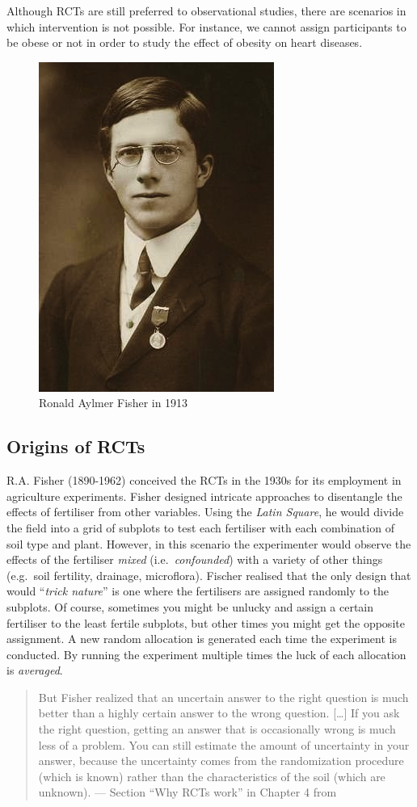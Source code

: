 \documentclass[
]{book}
\begin{document}
Although RCTs are still preferred to observational studies, there are scenarios in which intervention is not possible. For instance, we cannot assign participants to be obese or not in order to study the effect of obesity on heart diseases.

\begin{figure}  
 \begin{center}
    \includegraphics[width=.22\textwidth]{Figures/RAFisher.jpeg}  
  \captionsetup{labelformat=empty}
  \caption{Ronald Aylmer Fisher in 1913} 
\end{center}
\end{figure}
\addtocounter{figure}{-1}

\hypertarget{origins-of-rcts}{%
\subsection{Origins of RCTs}\label{origins-of-rcts}}

R.A. Fisher (1890-1962) conceived the RCTs in the 1930s for its employment in agriculture experiments. Fisher designed intricate approaches to disentangle the effects of fertiliser from other variables. Using the \emph{Latin Square}, he would divide the field into a grid of subplots to test each fertiliser with each combination of soil type and plant. However, in this scenario the experimenter would observe the effects of the fertiliser \emph{mixed} (i.e.~\emph{confounded}) with a variety of other things (e.g.~soil fertility, drainage, microflora). Fischer realised that the only design that would ``\emph{trick nature}'' is one where the fertilisers are assigned randomly to the subplots. Of course, sometimes you might be unlucky and assign a certain fertiliser to the least fertile subplots, but other times you might get the opposite assignment. A new random allocation is generated each time the experiment is conducted. By running the experiment multiple times the luck of each allocation is \emph{averaged}.

\begin{quote}
But Fisher realized that an uncertain answer to the right question is much better than a highly certain answer to the wrong question. {[}\ldots{]} If you ask the right question, getting an answer that is occasionally wrong is much less of a problem. You can still estimate the amount of uncertainty in your answer, because the uncertainty comes from the randomization procedure (which is known) rather than the characteristics of the soil (which are unknown). --- Section ``Why RCTs work'' in Chapter 4 from \citep{book-of-why}
\end{quote}
\end{document}
